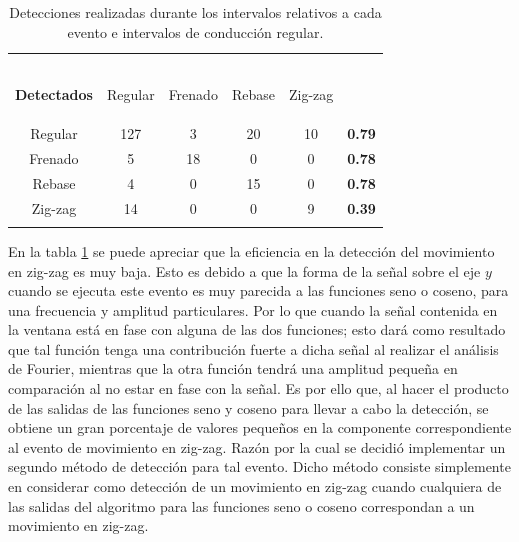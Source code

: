 \begin{table}[H]
\centering
\begin{tabular}{||c|c|c|c|c||c||}
\hhline{|t:=====:t:=:t|}
\backslashbox{\bf Etiqueta\\ \\ }{\\ \bf Detectados} & \begin{sideways}\hspace{-0.7cm}Regular\end{sideways} & \begin{sideways}\hspace{-0.7cm}Frenado\end{sideways} & \begin{sideways}\hspace{-0.7cm}Rebase\end{sideways} & \begin{sideways}\hspace{-0.7cm}Zig-zag\end{sideways} & \begin{sideways}\hspace{-0.7cm}{\bf Eficiencia}\end{sideways} \\ 
\hhline{||-----||-||}
Regular & 127 & 3 & 20 & 10 & \bf 0.79 \\ 
\hhline{||-----||-||}
Frenado & 5 & 18 & 0 & 0 & \bf 0.78 \\ 
\hhline{||-----||-||}
Rebase & 4 & 0 & 15 & 0 & \bf 0.78 \\ 
\hhline{||-----||-||}
Zig-zag & 14 & 0 & 0 & 9 & \bf 0.39 \\ 
\hhline{|b:=====:b:=:b|}
\end{tabular}
\caption{Detecciones realizadas durante los intervalos relativos a cada evento e intervalos de conducción regular.}
\label{matriz}
\end{table}

En la tabla \ref{matriz} se puede apreciar que la eficiencia en la detección del movimiento en zig-zag es muy baja.
Esto es debido a que la forma de la señal sobre el eje $y$ cuando se ejecuta este evento es muy parecida a las funciones seno o coseno, para una frecuencia y amplitud particulares.
Por lo que cuando la señal contenida en la ventana está en fase con alguna de las dos funciones; esto dará como resultado que tal función tenga una contribución fuerte a dicha señal al realizar el análisis de Fourier, mientras que la otra función tendrá una amplitud pequeña en comparación al no estar en fase con la señal.
Es por ello que, al hacer el producto de las salidas de las funciones seno y coseno para llevar a cabo la detección, se obtiene un gran porcentaje de valores pequeños en la componente correspondiente al evento de movimiento en zig-zag. 
Razón por la cual se decidió implementar un segundo método de detección para tal evento.
Dicho método consiste simplemente en considerar como detección de un movimiento en zig-zag cuando cualquiera de las salidas del algoritmo para las funciones seno o coseno correspondan a un movimiento en zig-zag.

